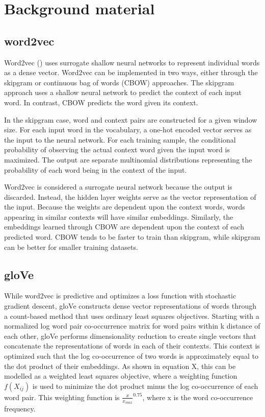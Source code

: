 \section{\label{sec:level3} Background material}

\subsection{word2vec}

Word2vec (\cite{word2vec}) uses surrogate shallow neural networks to represent individual words as a dense vector. Word2vec can be implemented in two ways, either through the skipgram or continuous bag of words (CBOW) approaches. The skipgram approach uses a shallow neural network to predict the context of each input word. In contrast, CBOW predicts the word given its context. 

In the skipgram case, word and context pairs are constructed for a given window size. For each input word in the vocabulary, a one-hot encoded vector serves as the input to the neural network. For each training sample, the conditional probability of observing the actual context word given the input word is maximized. The output are separate multinomial distributions representing the probability of each word being in the context of the input.

Word2vec is considered a surrogate neural network because the output is discarded. Instead, the hidden layer weights serve as the vector representation of the input. Because the weights are dependent upon the context words, words appearing in similar contexts will have similar embeddings. Similarly, the embeddings learned through CBOW are dependent upon the context of each predicted word. CBOW tends to be faster to train than skipgram, while skipgram can be better for smaller training datasets.

\subsection{gloVe}

While word2vec is predictive and optimizes a loss function with stochastic gradient descent, gloVe constructs dense vector representations of words through a count-based method that uses ordinary least squares objectives. Starting with a normalized log word pair co-occurrence matrix for word pairs within k distance of each other, gloVe performs dimensionality reduction to create single vectors that concatenate the representations of words in each of their contexts. This context is optimized such that the log co-occurrence of two words is approximately equal to the dot product of their embeddings. As shown in equation X, this can be modelled as a weighted least squares objective, where a weighting function $f(X_{ij})$ is used to minimize the dot product minus the log co-occurrence of each word pair. This weighting function is $\frac{x}{x_{max}}^{0.75}$, where x is the word co-occurrence frequency. 

